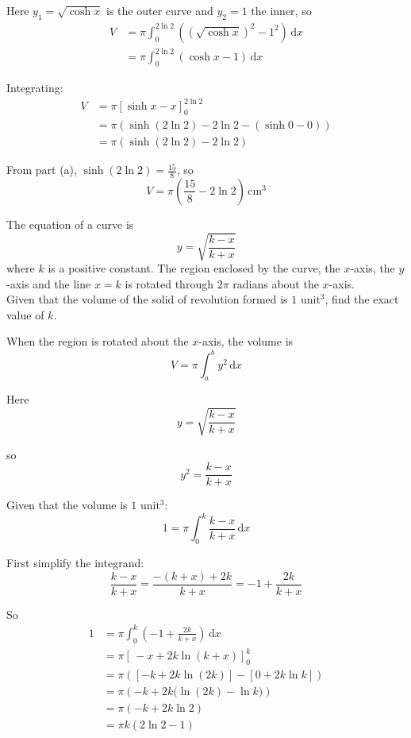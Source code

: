 \documentclass[leqno]{article}
\begin{document}
\begin{enumerate}[
  label=\textbf{\arabic*.},
  leftmargin=*,
  topsep=0pt,
  partopsep=0pt,
  parsep=0pt
]
\begin{djsSolution}
\begin{enumerate}[label=\textbf{(\alph*)}]
  Here $y_1=\sqrt{\cosh x}$ is the outer curve and $y_2=1$ the inner, so
  \begin{align*}
  V&=\pi\int_0^{2\ln 2}\left(\left(\sqrt{\cosh x}\right)^2-1^2\right)\,\mathrm{d}x \\
   &=\pi\int_0^{2\ln 2}(\cosh x-1)\,\mathrm{d}x
  \end{align*}

  Integrating:
  \begin{align*}
  V&=\pi\left[\sinh x-x\right]_0^{2\ln 2} \\
   &=\pi\left(\sinh(2\ln 2)-2\ln 2-(\sinh 0-0)\right) \\
   &=\pi\left(\sinh(2\ln 2)-2\ln 2\right)
  \end{align*}

  From part (a), $\sinh(2\ln 2)=\frac{15}{8}$, so
  \[
  V=\pi\left(\frac{15}{8}-2\ln 2\right)\,\mathrm{cm}^3
  \]
\end{enumerate}
\end{djsSolution}


\newpage

\questionitem

The equation of a curve is
\[
y = \sqrt{\frac{k-x}{k+x}}
\]
where $k$ is a positive constant. The region enclosed by the curve, the $x$-axis, the $y$-axis and the line $x = k$ is rotated through $2\pi$ radians about the $x$-axis. \\

Given that the volume of the solid of revolution formed is $1$ unit$^3$, find the exact value of $k$. 

\vspace*{10pt}

\begin{djsSolution}
When the region is rotated about the $x$-axis, the volume is
\[
V=\pi\int_a^b y^2\,\mathrm{d}x
\]

Here
\[
y=\sqrt{\frac{k-x}{k+x}}
\]

so
\[
y^2=\frac{k-x}{k+x}
\]

Given that the volume is $1\text{ unit}^3$:
\[
1=\pi\int_0^k \frac{k-x}{k+x}\,\mathrm{d}x
\]

First simplify the integrand:
\[
\frac{k-x}{k+x}=\frac{-(k+x)+2k}{k+x}=-1+\frac{2k}{k+x}
\]

So
\begin{align*}
1&=\pi\int_0^k \left(-1+\frac{2k}{k+x}\right)\,\mathrm{d}x \\
&=\pi\left[\,-x+2k\ln(k+x)\right]_0^k \\
&=\pi\left(\left[-k+2k\ln(2k)\right]-\left[0+2k\ln k\right]\right) \\
&=\pi\left(-k+2k\bigl(\ln(2k)-\ln k\bigr)\right) \\
&=\pi\left(-k+2k\ln 2\right) \\
&=\pi k(2\ln 2-1)
\end{align*}


\end{djsSolution}
\end{enumerate}
\end{document}
